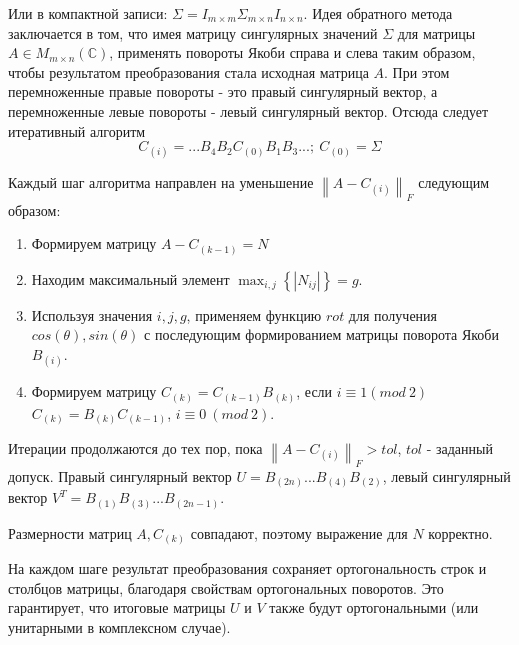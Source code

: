 Или в компактной записи: $\Sigma = I_{m\times m}\Sigma_{m\times n}I_{n\times n}$.
Идея обратного метода заключается в том, что имея матрицу сингулярных значений $\Sigma$ для матрицы $A\in M_{m\times n}(\mathbb{C})$, применять повороты Якоби справа и слева таким образом, чтобы результатом преобразования стала исходная матрица $A$. При этом перемноженные правые повороты - это правый сингулярный вектор, а перемноженные левые повороты - левый сингулярный вектор. Отсюда следует итеративный алгоритм
\begin{equation}
    C_{(i)}=...B_4B_2C_{(0)}B_1B_3...;\ C_{(0)} = \Sigma
\end{equation}

Каждый шаг алгоритма направлен на уменьшение $\left\|  A-C_{(i)}\right\|_F$ следующим образом:
\begin{enumerate}
    \item Формируем матрицу $A-C_{(k-1)} = N$
    \item Находим максимальный элемент $\displaystyle\max_{i,j}\left\{ \left| N_{ij} \right| \right\} = g$. 
    \item Используя значения $i,j,g$, применяем функцию $rot$ для получения $cos(\theta),sin(\theta)$ с последующим формированием матрицы поворота Якоби $B_{(i)}$. 
    \item Формируем матрицу $C_{(k)} = C_{(k - 1)}B_{(k)}$, если $i \equiv 1(mod\ 2)$\newline
    $C_{(k)} = B_{(k)}C_{(k - 1)}$, $i \equiv 0 \ (mod\ 2)$.
\end{enumerate}
Итерации продолжаются до тех пор, пока $\left\|  A-C_{(i)}\right\|_F >tol$, $tol$ - заданный допуск. Правый сингулярный вектор $U = B_{(2n)}...B_{(4)}B_{(2)}$, левый сингулярный вектор $V^T = B_{(1)}B_{(3)}...B_{(2n-1)}$.

\begin{note}
    Размерности матриц $A, C_{(k)}$ совпадают, поэтому выражение для $N$ корректно.
\end{note}

\begin{note}
    На каждом шаге результат преобразования сохраняет ортогональность строк и столбцов матрицы, благодаря свойствам ортогональных поворотов. Это гарантирует, что итоговые матрицы $U$ и $V$ также будут ортогональными (или унитарными в комплексном случае).
\end{note}

